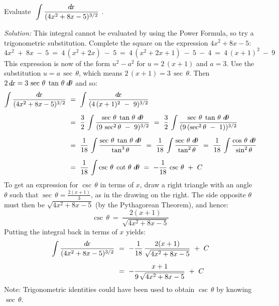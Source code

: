 \begin{exmp}\label{exmp:trigsub3}
\noindent Evaluate $~\displaystyle\int \frac{d\!x}{(4x^2 + 8x - 5)^{3/2}}~$.\vspace{1mm}
\par\noindent\emph{Solution:} This integral cannot be evaluated by using the
Power Formula, so try a trigonometric substitution. Complete the square on the
expression $4x^2 + 8x - 5$:
\[
4x^2 ~+~ 8x ~-~ 5 ~=~ 4\,(x^2 + 2x) ~-~ 5
~=~ 4\,(x^2 + 2x + 1) ~-~ 5 ~-~ 4
~=~ 4\,(x + 1)^2 ~-~ 9
\]
This expression is now of the form $u^2 - a^2$ for $u=2\,(x+1)$ and $a=3$. Use
the substitution $u=a\,\sec\,\theta$, which means $2\,(x+1) = 3\,\sec\,\theta$.
Then $2\,d\!x = 3\,\sec\,\theta\;\tan\,\theta\;d\!\theta$ and so:
\begin{align*}
\int \frac{\dx}{(4x^2 + 8x - 5)^{3/2}} ~&=~ \int \frac{\dx}{(4\,(x + 1)^2 ~-~ 9)^{3/2}}\\[6pt]
&=~ \frac{3}{2}\,\int \frac{\sec\,\theta\;\tan\,\theta~\dtheta}{(9\,\sec^2 \theta ~-~ 9)^{3/2}}
~=~ \frac{3}{2}\,\int \frac{\sec\,\theta\;\tan\,\theta~\dtheta}{(9\,(\sec^2 \theta ~-~ 1))^{3/2}}\\[6pt]
&=~ \frac{1}{18}\,\int \frac{\sec\,\theta\;\tan\,\theta~\dtheta}{\tan^3 \theta}
~=~ \frac{1}{18}\,\int \frac{\sec\,\theta~\dtheta}{\tan^2 \theta}
~=~ \frac{1}{18}\,\int \frac{\cos\,\theta~\dtheta}{\sin^2 \theta}\\[6pt]
&=~ \frac{1}{18}\,\int \csc\,\theta\;\cot\,\theta~\dtheta
~=~ -\frac{1}{18}\,\csc\,\theta ~+~ C
\end{align*}
\noindent To get an expression for $\csc\,\theta$ in terms of $x$, draw a right
triangle with an angle $\theta$ such that $\sec\,\theta = \frac{2(x+1)}{3}$, as
in the drawing on the right. The side opposite $\theta$ must then be
$\sqrt{4x^2 + 8x - 5}$ (by the Pythagorean Theorem), and hence:
\[
\csc\,\theta ~=~ \frac{2(x+1)}{\sqrt{4x^2 + 8x - 5}}
\]
Putting the integral back in terms of $x$ yields:
\begin{align*}
\int \frac{d\!x}{(4x^2 + 8x - 5)^{3/2}} ~&=~
 -\frac{1}{18}\,\frac{2(x+1)}{\sqrt{4x^2 + 8x - 5}} ~+~ C\\[6pt]
&=~ -\frac{x+1}{9\,\sqrt{4x^2 + 8x - 5}} ~+~ C
\end{align*}
Note: Trigonometric identities could have been used to obtain $\csc\,\theta$ by
knowing $\sec\,\theta$.
\end{exmp}\vspace{-2mm}
\divider
\vspace{2mm}

